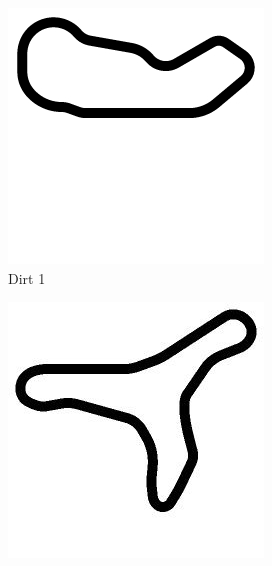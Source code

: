 \begin{figure}
\begin{subfigure}[b]{0.2\textwidth}
       \includegraphics[width=\textwidth]{img/tracks/Dirt1}
       \caption{Dirt 1}
   \end{subfigure}
\begin{subfigure}[b]{0.2\textwidth}
       \includegraphics[width=\textwidth]{img/tracks/Dirt3}

\end{subfigure}
\end{figure}
